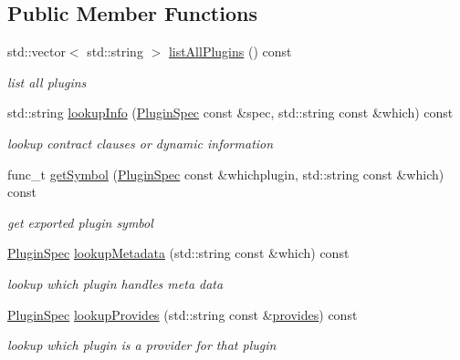 \subsection*{Public Member Functions}
\begin{DoxyCompactItemize}
\item 
std\+::vector$<$ std\+::string $>$ \hyperlink{classkdb_1_1tools_1_1ModulesPluginDatabase_a0aa3ca734a18da8f3818e0278697eaef}{list\+All\+Plugins} () const 
\begin{DoxyCompactList}\small\item\em list all plugins \end{DoxyCompactList}\item 
std\+::string \hyperlink{classkdb_1_1tools_1_1ModulesPluginDatabase_a3d06a4b33e4bcc879dd6f562a8876390}{lookup\+Info} (\hyperlink{classkdb_1_1tools_1_1PluginSpec}{Plugin\+Spec} const \&spec, std\+::string const \&which) const 
\begin{DoxyCompactList}\small\item\em lookup contract clauses or dynamic information \end{DoxyCompactList}\item 
func\+\_\+t \hyperlink{classkdb_1_1tools_1_1ModulesPluginDatabase_aa126810a0a5522cc410af6b5f77edf7a}{get\+Symbol} (\hyperlink{classkdb_1_1tools_1_1PluginSpec}{Plugin\+Spec} const \&whichplugin, std\+::string const \&which) const 
\begin{DoxyCompactList}\small\item\em get exported plugin symbol \end{DoxyCompactList}\item 
\hyperlink{classkdb_1_1tools_1_1PluginSpec}{Plugin\+Spec} \hyperlink{classkdb_1_1tools_1_1ModulesPluginDatabase_a7a7ccedd922ce214c61495e7a3ec26b9}{lookup\+Metadata} (std\+::string const \&which) const 
\begin{DoxyCompactList}\small\item\em lookup which plugin handles meta data \end{DoxyCompactList}\item 
\hyperlink{classkdb_1_1tools_1_1PluginSpec}{Plugin\+Spec} \hyperlink{classkdb_1_1tools_1_1ModulesPluginDatabase_a24007d69527e5139c2dbb2004bf7a8d0}{lookup\+Provides} (std\+::string const \&\hyperlink{classkdb_1_1tools_1_1PluginDatabase_afc91ff760616ee83c6afb70e5a2f0601a73ff10d6a07213c277db4326b3df6c4b}{provides}) const 
\begin{DoxyCompactList}\small\item\em lookup which plugin is a provider for that plugin \end{DoxyCompactList}\end{DoxyCompactItemize}
